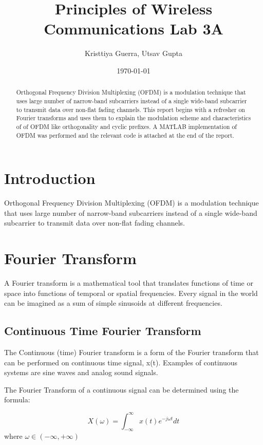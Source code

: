 \documentclass{article}
\title{Principles of Wireless Communications Lab 3A}
\author{Kristtiya Guerra, Utsav Gupta} %
\date{\today}
\begin{document}
\maketitle

\begin{abstract}
    Orthogonal Frequency Division Multiplexing (OFDM) is a modulation technique that uses large number of narrow-band subcarriers instead of a single wide-band subcarrier to transmit data over non-flat fading channels. This report begins with a refresher on Fourier transforms and uses them to explain the modulation scheme and characteristics of of OFDM like orthogonality and cyclic prefixes. A MATLAB implementation of OFDM was performed and the relevant code is attached at the end of the report.
\end{abstract}

\section{Introduction}

Orthogonal Frequency Division Multiplexing (OFDM) is a modulation technique that uses large number of narrow-band subcarriers instead of a single wide-band subcarrier to transmit data over non-flat fading channels.

\section{Fourier Transform}
A Fourier transform is a mathematical tool that translates functions of time or space into functions of temporal or spatial frequencies. Every signal in the world can be imagined as a sum of simple sinusoids at different frequencies.    

\subsection{Continuous Time Fourier Transform}
The Continuous (time) Fourier transform is a form of the Fourier transform that can be performed on continuous time signal, x(t). Examples of continuous systems are sine waves and analog sound signals. 

The Fourier Transform of a continuous signal can be determined using the formula:

\begin{equation}
    X(\omega) = \int_{-\infty}^{\infty} x(t)e^{-j\omega t} dt
\end{equation}
where $\omega \in (-\infty,+\infty)$
\end{document}
